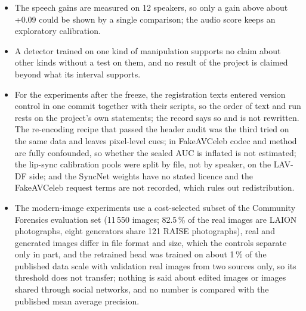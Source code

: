 \documentclass[conference,a4paper]{IEEEtran_nodash}
\begin{document}
\begin{itemize}
        control shows sensitivity to a clean injected sinusoid only, not to a
        real pulse or to one that has passed through compression.
  \item The speech gains are measured on 12 speakers, so only a gain above about
        +0.09 could be shown by a single comparison; the audio score keeps an
        exploratory calibration.
  \item A detector trained on one kind of manipulation supports no claim about
        other kinds without a test on them, and no result of the project is
        claimed beyond what its interval supports.
  \item For the experiments after the freeze, the registration texts entered
        version control in one commit together with their scripts, so the order
        of text and run rests on the project's own statements; the record says
        so and is not rewritten. The re-encoding recipe that passed the header
        audit was the third tried on the same data and leaves pixel-level cues;
        in FakeAVCeleb codec and method are fully confounded, so whether the
        sealed AUC is inflated is not estimated; the lip-sync calibration pools
        were split by file, not by speaker, on the LAV-DF side; and the SyncNet
        weights have no stated licence and the FakeAVCeleb request terms are not
        recorded, which rules out redistribution. %
  \item The modern-image experiments use a cost-selected subset of the
        Community Forensics evaluation set (11\,550 images; 82.5\,\% of the real
        images are LAION photographs, eight generators share 121 RAISE photographs),
        real and generated images differ in file format and size, which the controls
        separate only in part, and the retrained head was trained on about 1\,\% of
        the published data scale with validation real images from two sources only,
        so its threshold does not transfer; nothing is said about edited images or
        images shared through social networks, and no number is compared with the
        published mean average precision. %
\end{itemize}

\end{document}
